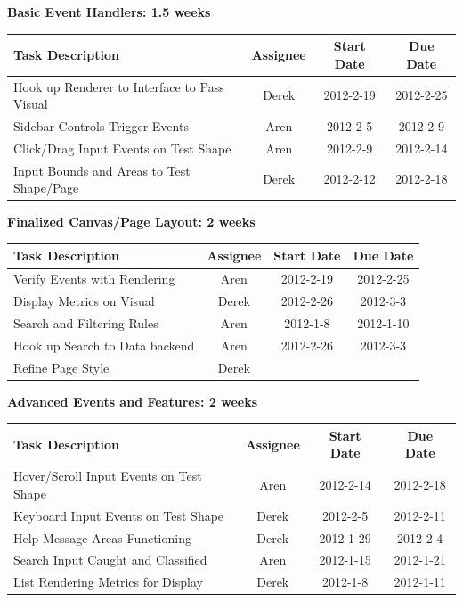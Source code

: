 \documentclass[12pt, letterpaper]{article}
\begin{document}
  \begin{center}
		{\bf Basic Event Handlers: 1.5 weeks}
    \begin{tabular}{| p{8.3cm} || c | c | c | }
      \hline
      Task Description & Assignee & Start Date & Due Date \\
      \hline
	    Hook up Renderer to Interface to Pass Visual & Derek & 2012-2-19 & 2012-2-25 \\
 	    Sidebar Controls Trigger Events & Aren & 2012-2-5 & 2012-2-9 \\
	    Click/Drag Input Events on Test Shape & Aren & 2012-2-9 & 2012-2-14 \\
	    Input Bounds and Areas to Test Shape/Page & Derek & 2012-2-12 & 2012-2-18 \\
      \hline
    \end{tabular}
  \end{center}

  \begin{center}
		{\bf Finalized Canvas/Page Layout: 2 weeks}
    \begin{tabular}{| p{8.3cm} || c | c | c | }
      \hline
      Task Description & Assignee & Start Date & Due Date \\
      \hline
	    Verify Events with Rendering & Aren & 2012-2-19 & 2012-2-25 \\
	    Display Metrics on Visual & Derek & 2012-2-26 & 2012-3-3 \\
	    Search and Filtering Rules & Aren & 2012-1-8 & 2012-1-10 \\
	    Hook up Search to Data backend & Aren & 2012-2-26 & 2012-3-3 \\
		Refine Page Style & Derek &  &  \\
      \hline
    \end{tabular}
  \end{center}

  \begin{center}
		{\bf Advanced Events and Features: 2 weeks}
    \begin{tabular}{| p{8.3cm} || c | c | c | }
      \hline
      Task Description & Assignee & Start Date & Due Date \\
      \hline
	    Hover/Scroll Input Events on Test Shape & Aren & 2012-2-14 & 2012-2-18 \\
	    Keyboard Input Events on Test Shape & Derek & 2012-2-5 & 2012-2-11 \\
	    Help Message Areas Functioning & Derek & 2012-1-29 & 2012-2-4 \\
	    Search Input Caught and Classified & Aren & 2012-1-15 & 2012-1-21 \\
	    List Rendering Metrics for Display & Derek & 2012-1-8 & 2012-1-11 \\
      \hline
    \end{tabular}
  \end{center}
\end{document}
